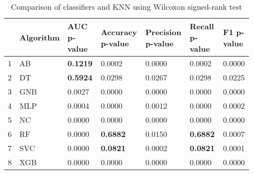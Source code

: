 \begin{table}
\footnotesize
\caption{Comparison of classifiers and KNN using Wilcoxon signed-rank test}
\label{tab:wilcoxon comparison}
\begin{tabular}{lllllll}
\hline
 & Algorithm & AUC p-value & Accuracy p-value & Precision p-value & Recall p-value & F1 p-value \\
\hline
1 & AB & \textbf{0.1219} & 0.0002 & 0.0000 & 0.0002 & 0.0000 \\
2 & DT & \textbf{0.5924} & 0.0298 & 0.0267 & 0.0298 & 0.0225 \\
3 & GNB & 0.0027 & 0.0000 & 0.0000 & 0.0000 & 0.0000 \\
4 & MLP & 0.0004 & 0.0000 & 0.0012 & 0.0000 & 0.0002 \\
5 & NC & 0.0000 & 0.0000 & 0.0000 & 0.0000 & 0.0000 \\
6 & RF & 0.0000 & \textbf{0.6882} & 0.0150 & \textbf{0.6882} & 0.0007 \\
7 & SVC & 0.0000 & \textbf{0.0821} & 0.0002 & \textbf{0.0821} & 0.0001 \\
8 & XGB & 0.0000 & 0.0000 & 0.0000 & 0.0000 & 0.0000 \\
\hline
\end{tabular}
\end{table}
